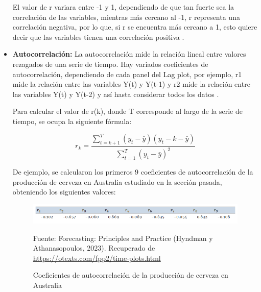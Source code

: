 \begin{itemize}
    El valor de r variara entre -1 y 1, dependiendo de que tan fuerte sea la correlación de las variables, mientras más cercano al -1, r representa una correlación negativa, por lo que, si r se encuentra más cercano a 1, esto quiere decir que las variables tienen una correlación positiva \cite{forecast-time-series-arima}.

    \item \textbf{Autocorrelación:} La autocorrelación mide la relación lineal entre valores rezagados de una serie de tiempo. Hay variados coeficientes de autocorrelación, dependiendo de cada panel del Lag plot, por ejemplo, r1 mide la relación entre las variables Y(t) y Y(t-1) y r2 mide la relación entre las variables Y(t) y Y(t-2) y así hasta considerar todos los datos \cite{forecast-time-series-arima}.
    
    Para calcular el valor de r(k), donde T corresponde al largo de la serie de tiempo, se ocupa la siguiente fórmula:

    \begin{equation*}
        r_k = \frac{\sum_{t=k+1}^{T}{(y_t - \bar{y})(y_t-k - \bar{y})}}{\sum_{t=1}^{T}(y_t - \bar{y})^2}
    \end{equation*}  

    De ejemplo, se calcularon los primeros 9 coeficientes de autocorrelación de la producción de cerveza en Australia estudiado en la sección pasada, obteniendo los siguientes valores:

    \begin{figure}[H]
        \begin{minipage}[t]{0.9\textwidth}
            \caption{Coeficientes de autocorrelación de la producción de cerveza en Australia}
            \label{autocorrelaciones1}        
        \end{minipage}
    
        \vspace{10pt}
    
        \begin{minipage}[b]{0.9\textwidth}
            \centering
            \includegraphics[width=\textwidth]{img/ejemplo_autocorrelaciones.png}        
        \end{minipage}
    
        \begin{minipage}[t]{0.9\textwidth}
            Fuente: Forecasting: Principles and Practice (Hyndman y Athanasopoulos, 2023). Recuperado de \url{https://otexts.com/fpp2/time-plots.html}
        \end{minipage}
    \end{figure}


\end{itemize}

